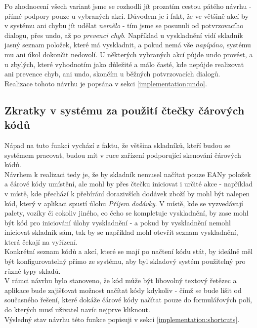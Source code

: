 Po zhodnocení všech variant jsme se rozhodli jít prozatím cestou pátého návrhu - přímé podpory pouze u vybraných akcí. Důvodem je i fakt, že ve většině akcí by v systému ani chybu jít udělat \emph{nemělo} - tím jsme se posunuli od potvrzovacího dialogu, přes undo, až po \emph{prevenci chyb}. Například u vyskladnění vidí skladník jasný seznam položek, které má vyskladnit, a pokud nemá vše \emph{napípáno}, systému mu ani úkol dokončit nedovolí. U některých vybraných akcí půjde undo provést, a u zbylých, které vyhodnotím jako důležité a málo časté, kde nepůjde realizovat ani prevence chyb, ani undo, skončím u běžných potvrzovacích dialogů.\\
Realizace tohoto návrhu je popsána v sekci \ref{implementation:undo}.


\subsection{Zkratky v systému za použití čtečky čárových kódů}\label{draft:shortcuts}

Nápad na tuto funkci vychází z faktu, že většina skladníků, kteří budou se systémem pracovat, budou mít v ruce zařízení podporující skenování čárových kódů.\\
Návrhem k realizaci tedy je, že by skladník nemusel načítat pouze EANy položek a čárové kódy umístění, ale mohl by přes čtečku iniciovat i určité akce - například v místě, kde přechází k přebírání dorazivších dodávek zboží by mohl být nalepen kód, který v aplikaci spustí úlohu \emph{Příjem dodávky}. V místě, kde se vyzvedávají palety, vozíky či cokoliv jiného, co čeho se kompletuje vyskladnění, by zase mohl být kód pro iniciování úlohy vyskladnění - a pokud by vyskladnění nemohl iniciovat skladník sám, tak by se například mohl otevřít seznam vyskladnění, která čekají na vyřízení.\\
Konkrétní seznam kódů a akcí, které se mají po načtení kódu stát, by ideálně měl být konfigurovatelný přímo ze systému, aby byl skladový systém použitelný pro různé typy skladů.\\
V rámci návrhu bylo stanoveno, že kód může být libovolný textový řetězec a aplikace bude zajišťovat možnost načítat kódy kdykoliv - čímž se bude lišit od současného řešení, které dokáže čárové kódy načítat pouze do formulářových polí, do kterých musí uživatel navíc nejprve kliknout.\\
Výsledný stav návrhu této funkce popisuji v sekci \ref{implementation:shortcuts}.
